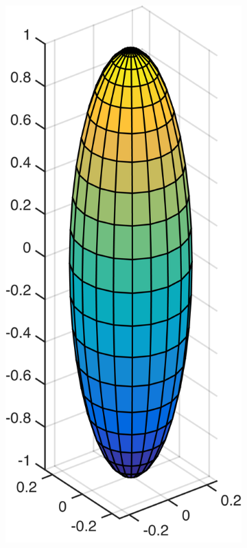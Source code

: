 \documentclass[a4paper,11pt]{kth-mag}
\begin{document}
\begin{figure}[!htbp]
  \centering
  \begin{subfigure}[h]{0.24\textwidth}
    \centering
    \includegraphics[width=\textwidth]{img/slender/1_4.png}

\end{subfigure}
\end{figure}
\end{document}
